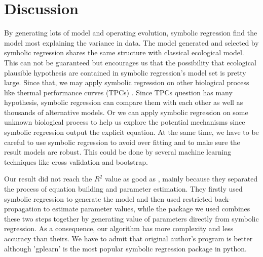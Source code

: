 \documentclass[11pt,a4paper]{article}
\begin{document}
\section{Discussion}
By generating lots of model and operating evolution, symbolic regression find the model most explaining the variance in data. The model generated and selected by symbolic regression shares the same structure with classical ecological model. This can not be guaranteed but encourages us that the possibility that ecological plausible hypothesis are contained in symbolic regression's model set is pretty large. Since that, we may apply symbolic regression on other biological process like thermal performance curves (TPCs) \citep{Luhring2017}. Since TPCs question has many hypothesis, symbolic regression can compare them with each other as well as thousands of alternative models. Or we can apply symbolic regression on some unknown biological process to help us explore the potential mechanisms since symbolic regression output the explicit equation. At the same time, we have to be careful to use symbolic regression to avoid over fitting and to make sure the result models are robust. This could be done by several machine learning techniques like cross validation and bootstrap. 

Our result did not reach the $R^{2}$ value as good as \citet{BenjaminT.MartinStephanB.Munch2018}, mainly because they separated the process of equation building and parameter estimation. They firstly used symbolic regression to generate the model and then used restricted back-propagation \citep{Riedmiller92rprop-} to estimate parameter values, while the package we used combines these two steps together by generating value of parameters directly from symbolic regression. As a consequence, our algorithm has more complexity and less accuracy than theirs. We have to admit that original author's program is better although 'gplearn' is the most popular symbolic regression package in python. 

\newpage


\newpage
\end{document}
